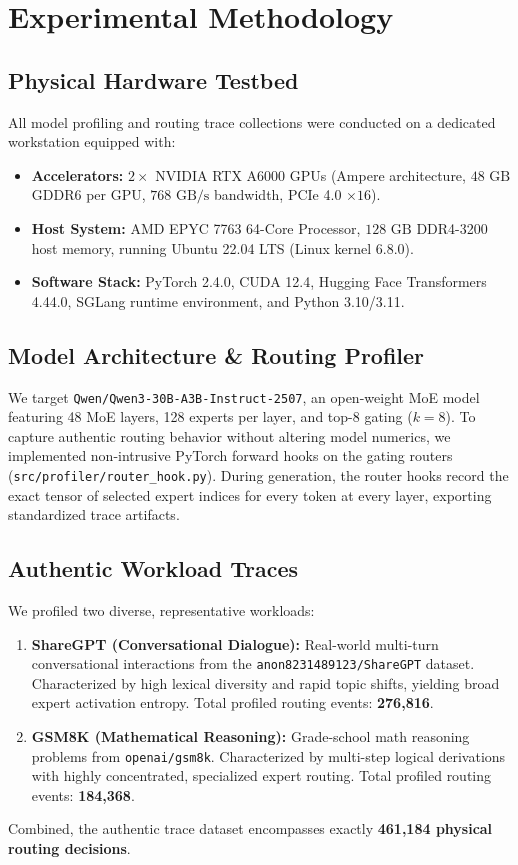 \documentclass[10pt,journal,compsoc]{IEEEtran}
\begin{document}
\section{Experimental Methodology}
\label{sec:methodology}

\subsection{Physical Hardware Testbed}
All model profiling and routing trace collections were conducted on a dedicated workstation equipped with:
\begin{itemize}
    \item \textbf{Accelerators:} $2 \times$ NVIDIA RTX A6000 GPUs (Ampere architecture, $48\text{ GB}$ GDDR6 per GPU, $768\text{ GB/s}$ bandwidth, PCIe 4.0 $\times 16$).
    \item \textbf{Host System:} AMD EPYC 7763 64-Core Processor, $128\text{ GB}$ DDR4-3200 host memory, running Ubuntu 22.04 LTS (Linux kernel 6.8.0).
    \item \textbf{Software Stack:} PyTorch 2.4.0, CUDA 12.4, Hugging Face Transformers 4.44.0, SGLang runtime environment, and Python 3.10/3.11.
\end{itemize}

\subsection{Model Architecture \& Routing Profiler}
We target \texttt{Qwen/Qwen3-30B-A3B-Instruct-2507}, an open-weight MoE model featuring 48 MoE layers, 128 experts per layer, and top-8 gating ($k=8$). To capture authentic routing behavior without altering model numerics, we implemented non-intrusive PyTorch forward hooks on the gating routers (\texttt{src/profiler/router_hook.py}). During generation, the router hooks record the exact tensor of selected expert indices for every token at every layer, exporting standardized trace artifacts.

\subsection{Authentic Workload Traces}
We profiled two diverse, representative workloads:
\begin{enumerate}
    \item \textbf{ShareGPT (Conversational Dialogue):} Real-world multi-turn conversational interactions from the \texttt{anon8231489123/ShareGPT} dataset. Characterized by high lexical diversity and rapid topic shifts, yielding broad expert activation entropy. Total profiled routing events: \textbf{276,816}.
    \item \textbf{GSM8K (Mathematical Reasoning):} Grade-school math reasoning problems from \texttt{openai/gsm8k}. Characterized by multi-step logical derivations with highly concentrated, specialized expert routing. Total profiled routing events: \textbf{184,368}.
\end{enumerate}
Combined, the authentic trace dataset encompasses exactly \textbf{461,184 physical routing decisions}.
\end{document}
